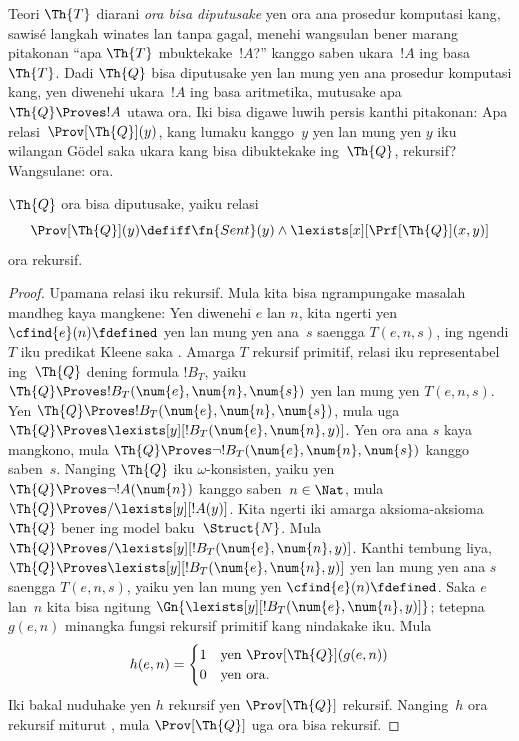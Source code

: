 \documentclass[../../../include/open-logic-section]{subfiles}
\begin{document}

Teori $\Th{T}$ diarani \emph{ora bisa diputusake} yen ora ana
prosedur komputasi kang, sawisé langkah winates lan tanpa gagal,
menehi wangsulan bener marang pitakonan ``apa $\Th{T}$
mbuktekake~$!A$?'' kanggo saben ukara~$!A$ ing basa~$\Th{T}$.
Dadi $\Th{Q}$ bisa diputusake yen lan mung yen ana prosedur komputasi
kang, yen diwenehi ukara~$!A$ ing basa aritmetika, mutusake apa
$\Th{Q} \Proves !A$ utawa ora. Iki bisa digawe luwih persis kanthi
pitakonan: Apa relasi~$\Prov[\Th{Q}](y)$, kang lumaku kanggo~$y$
yen lan mung yen $y$ iku wilangan G\"odel saka ukara kang bisa
dibuktekake ing~$\Th{Q}$, rekursif? Wangsulane: ora.

\begin{thm}
$\Th{Q}$ ora bisa diputusake, yaiku relasi
\[
\Prov[\Th{Q}](y) \defiff \fn{Sent}(y) \land
\lexists[x][\Prf[\Th{Q}](x, y)]
\]
ora rekursif.
\end{thm}

\begin{proof}
Upamana relasi iku rekursif. Mula kita bisa ngrampungake masalah
mandheg kaya mangkene: Yen diwenehi $e$ lan $n$, kita ngerti yen
$\cfind{e}(n) \fdefined$ yen lan mung yen ana~$s$ saengga $T(e, n, s)$,
ing ngendi $T$ iku predikat Kleene saka
. Amarga $T$ rekursif primitif,
relasi iku representabel ing~$\Th{Q}$ dening formula $!B_T$, yaiku
$\Th{Q} \Proves !B_T(\num{e}, \num{n}, \num{s})$ yen lan mung yen
$T(e, n, s)$. Yen $\Th{Q} \Proves !B_T(\num{e}, \num{n}, \num{s})$,
mula uga $ \Th{Q} \Proves
\lexists[y][!B_T(\num{e}, \num{n}, y)]$. Yen ora ana $s$ kaya
mangkono, mula $\Th{Q} \Proves \lnot !B_T(\num{e}, \num{n}, \num{s})$
kanggo saben~$s$. Nanging $\Th{Q}$ iku $\omega$-konsisten, yaiku yen
$\Th{Q} \Proves \lnot !A(\num{n})$ kanggo saben~$n \in \Nat$, mula
$\Th{Q} \Proves/ \lexists[y][!A(y)]$. Kita ngerti iki amarga
aksioma-aksioma $\Th{Q}$ bener ing model baku~$\Struct{N}$.
Mula $\Th{Q} \Proves/
\lexists[y][!B_T(\num{e}, \num{n}, y)]$. Kanthi tembung liya,
$\Th{Q} \Proves \lexists[y][!B_T(\num{e}, \num{n}, y)]$ yen lan mung yen
ana $s$ saengga $T(e, n, s)$, yaiku yen lan mung yen
$\cfind{e}(n) \fdefined$. Saka $e$ lan~$n$ kita bisa ngitung
$\Gn{\lexists[y][!B_T(\num{e},
    \num{n}, y)]}$; tetepna $g(e, n)$ minangka fungsi rekursif
primitif kang nindakake iku. Mula
\[
h(e, n) =
\begin{cases}
1 & \text{yen $\Prov[\Th{Q}](g(e, n))$}\\
0 & \text{yen ora}.
\end{cases}
\]
Iki bakal nuduhake yen $h$ rekursif yen $\Prov[\Th{Q}]$ rekursif.
Nanging~$h$ ora rekursif miturut
, mula
$\Prov[\Th{Q}]$ uga ora bisa rekursif.
\end{proof}
\end{document}
